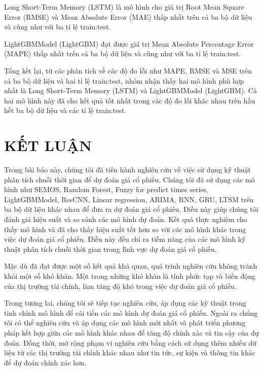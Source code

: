 \documentclass[conference]{IEEEtran}
\begin{document}
Long Short-Term Memory (LSTM) là mô hình cho giá trị Root Mean Square Error (RMSE) và Mean Absolute Error (MAE) thấp nhất trên cả ba bộ dữ liệu 
và cũng như với ba tỉ lệ train:test.

LightGBMModel (LightGBM) đạt được giá trị Mean Absolute Percentage Error (MAPE) thấp nhất trên cả ba bộ dữ liệu và 
cũng như với ba tỉ lệ train:test.

Tổng kết lại, từ các phân tích về các độ đo lỗi như MAPE, RMSE và MSE trên cả ba bộ dữ liệu và hai tỉ lệ train:test, 
nhóm nhận thấy hai mô hình phù hợp nhất là Long Short-Term Memory (LSTM) và LightGBMModel (LightGBM). 
Cả hai mô hình này đã cho kết quả tốt nhất trong các độ đo lỗi khác nhau trên hầu hết ba bộ dữ liệu và các tỉ lệ train:test.

\section{KẾT LUẬN}
Trong bài báo này, chúng tôi đã tiến hành nghiên cứu về việc sử dụng kỹ thuật phân tích chuỗi thời gian để dự đoán giá cổ phiếu. 
Chúng tôi đã sử dụng các mô hình như SEMOS, Random Forest, Fuzzy for predict times series, LightGBMModel, ResCNN, Linear regression, 
ARIMA, RNN, GRU, LTSM trên ba bộ dữ liệu khác nhau để đưa ra dự đoán giá cổ phiếu. 
Điều này giúp chúng tôi đánh giá hiệu suất và so sánh các mô hình dự đoán. Kết quả thực nghiệm cho thấy mô hình 
và đã cho thấy hiệu suất tốt hơn so với các mô hình khác trong việc dự đoán giá cổ phiếu. 
Điều này đều chỉ ra tiềm năng của các mô hình kỹ thuật phân tích chuỗi thời gian trong lĩnh vực dự đoán giá cổ phiếu.

Mặc dù đã đạt được một số kết quả khả quan, quá trình nghiên cứu không tránh khỏi một số khó khăn. 
Một trong những khó khăn là tính phức tạp và biến động của thị trường tài chính, làm tăng độ khó trong việc dự đoán giá cổ phiếu. 

Trong tương lai, chúng tôi sẽ tiếp tục nghiên cứu, áp dụng các kỹ thuật trong tinh chỉnh mô hình để cải tiến các mô hình 
dự đoán giá cổ phiếu. Ngoài ra chúng tôi có thể nghiên cứu và áp dụng các mô hình mới nhất và phát triển phương pháp kết hợp 
giữa các mô hình khác nhau để tăng độ chính xác và tin cậy của dự đoán. Đồng thời, mở rộng phạm vi nghiên cứu bằng cách sử dụng 
thêm nhiều dữ liệu từ các thị trường tài chính khác nhau như tin tức, sự kiện và thông tin khác để dự đoán chính xác hơn.
\end{document}
